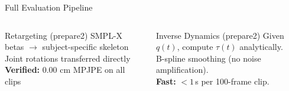 \documentclass[aspectratio=169, 10pt]{beamer}
\begin{document}
\begin{frame}{Full Evaluation Pipeline}
  \vspace{0.2em}
  \begin{columns}[T]
      \begin{block}{Retargeting (prepare2)}
        \small SMPL-X betas $\to$ subject-specific skeleton\\
        Joint rotations transferred directly\\
        \textbf{Verified:} 0.00 cm MPJPE on all clips
      \end{block}
      \begin{block}{Inverse Dynamics (prepare2)}
        \small Given $q(t)$, compute $\tau(t)$ analytically.\\
        B-spline smoothing (no noise amplification).\\
        \textbf{Fast:} $<1$\,s per 100-frame clip.
      \end{block}
  \end{columns}
\end{frame}

\end{document}
